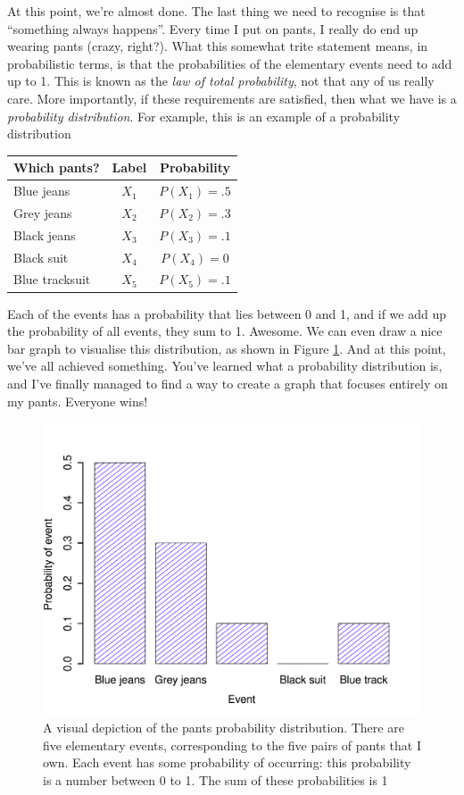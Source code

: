 \documentclass[
]{book}
\begin{document}
At this point, we're almost done. The last thing we need to recognise is that ``something always happens''. Every time I put on pants, I really do end up wearing pants (crazy, right?). What this somewhat trite statement means, in probabilistic terms, is that the probabilities of the elementary events need to add up to 1. This is known as the \emph{law of total probability}, not that any of us really care. More importantly, if these requirements are satisfied, then what we have is a \emph{probability distribution}. For example, this is an example of a probability distribution

\begin{longtable}[]{@{}lcc@{}}
\toprule
Which pants? & Label & Probability\tabularnewline
\midrule
\endhead
Blue jeans & \(X_1\) & \(P(X_1) = .5\)\tabularnewline
Grey jeans & \(X_2\) & \(P(X_2) = .3\)\tabularnewline
Black jeans & \(X_3\) & \(P(X_3) = .1\)\tabularnewline
Black suit & \(X_4\) & \(P(X_4) = 0\)\tabularnewline
Blue tracksuit & \(X_5\) & \(P(X_5) = .1\)\tabularnewline
\bottomrule
\end{longtable}

Each of the events has a probability that lies between 0 and 1, and if we add up the probability of all events, they sum to 1. Awesome. We can even draw a nice bar graph to visualise this distribution, as shown in Figure \ref{fig:4pantsprob}. And at this point, we've all achieved something. You've learned what a probability distribution is, and I've finally managed to find a way to create a graph that focuses entirely on my pants. Everyone wins!

\begin{figure}
\centering
\includegraphics{navarro_img/probability/pantsDistribution-eps-converted-to.png}
\caption{\label{fig:4pantsprob}A visual depiction of the pants probability distribution. There are five elementary events, corresponding to the five pairs of pants that I own. Each event has some probability of occurring: this probability is a number between 0 to 1. The sum of these probabilities is 1}
\end{figure}
\end{document}
